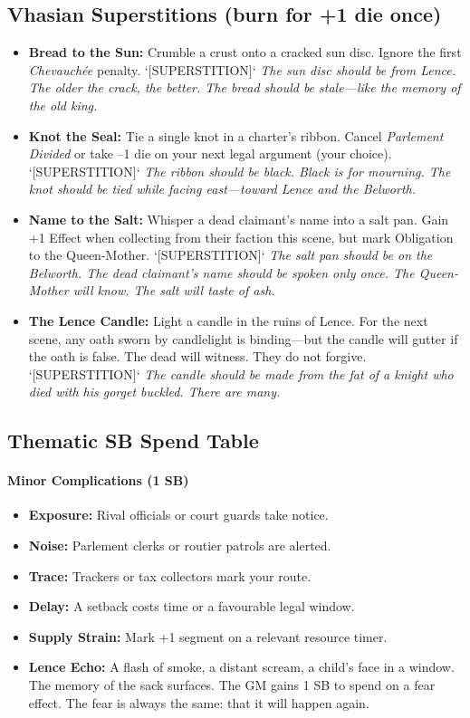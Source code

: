 \subsection*{Vhasian Superstitions (burn for +1 die once)}
\begin{itemize}
  \item \textbf{Bread to the Sun:} Crumble a crust onto a cracked sun disc. Ignore the first \emph{Chevauchée} penalty. \hfill `[SUPERSTITION]` \textit{The sun disc should be from Lence. The older the crack, the better. The bread should be stale---like the memory of the old king.}
  \item \textbf{Knot the Seal:} Tie a single knot in a charter's ribbon. Cancel \emph{Parlement Divided} or take --1 die on your next legal argument (your choice). \hfill `[SUPERSTITION]` \textit{The ribbon should be black. Black is for mourning. The knot should be tied while facing east---toward Lence and the Belworth.}
  \item \textbf{Name to the Salt:} Whisper a dead claimant's name into a salt pan. Gain +1 Effect when collecting from their faction this scene, but mark Obligation to the Queen-Mother. \hfill `[SUPERSTITION]` \textit{The salt pan should be on the Belworth. The dead claimant's name should be spoken only once. The Queen-Mother will know. The salt will taste of ash.}
  \item \textbf{The Lence Candle:} Light a candle in the ruins of Lence. For the next scene, any oath sworn by candlelight is binding---but the candle will gutter if the oath is false. The dead will witness. They do not forgive. \hfill `[SUPERSTITION]` \textit{The candle should be made from the fat of a knight who died with his gorget buckled. There are many.}
\end{itemize}

\subsection*{Thematic SB Spend Table}
\label{sec:vhasia-sb}

\paragraph{Minor Complications (1 SB)}
\begin{itemize}
\item \textbf{Exposure:} Rival officials or court guards take notice.
\item \textbf{Noise:} Parlement clerks or routier patrols are alerted.
\item \textbf{Trace:} Trackers or tax collectors mark your route.
\item \textbf{Delay:} A setback costs time or a favourable legal window.
\item \textbf{Supply Strain:} Mark +1 segment on a relevant resource timer.
\item \textbf{Lence Echo:} A flash of smoke, a distant scream, a child's face in a window. The memory of the sack surfaces. The GM gains 1 SB to spend on a fear effect. The fear is always the same: that it will happen again.
\end{itemize}

